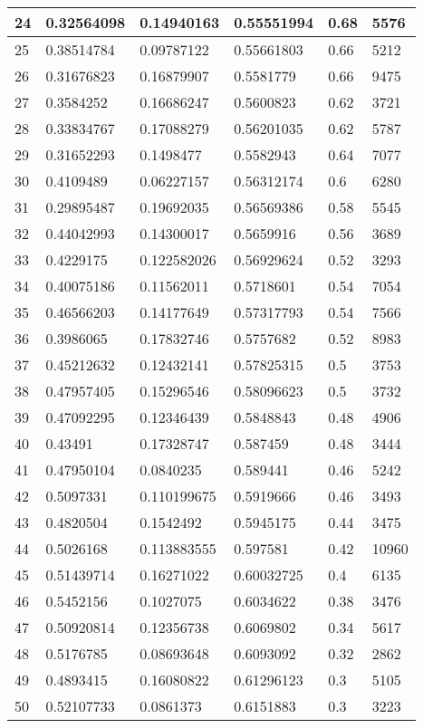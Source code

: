 \begin{longtable}{|l|l|l|l|l|l|}
24 & 0.32564098 & 0.14940163 & 0.55551994 & 0.68 & 5576 \\ \hline 
25 & 0.38514784 & 0.09787122 & 0.55661803 & 0.66 & 5212 \\ \hline 
26 & 0.31676823 & 0.16879907 & 0.5581779 & 0.66 & 9475 \\ \hline 
27 & 0.3584252 & 0.16686247 & 0.5600823 & 0.62 & 3721 \\ \hline 
28 & 0.33834767 & 0.17088279 & 0.56201035 & 0.62 & 5787 \\ \hline 
29 & 0.31652293 & 0.1498477 & 0.5582943 & 0.64 & 7077 \\ \hline 
30 & 0.4109489 & 0.06227157 & 0.56312174 & 0.6 & 6280 \\ \hline 
31 & 0.29895487 & 0.19692035 & 0.56569386 & 0.58 & 5545 \\ \hline 
32 & 0.44042993 & 0.14300017 & 0.5659916 & 0.56 & 3689 \\ \hline 
33 & 0.4229175 & 0.122582026 & 0.56929624 & 0.52 & 3293 \\ \hline 
34 & 0.40075186 & 0.11562011 & 0.5718601 & 0.54 & 7054 \\ \hline 
35 & 0.46566203 & 0.14177649 & 0.57317793 & 0.54 & 7566 \\ \hline 
36 & 0.3986065 & 0.17832746 & 0.5757682 & 0.52 & 8983 \\ \hline 
37 & 0.45212632 & 0.12432141 & 0.57825315 & 0.5 & 3753 \\ \hline 
38 & 0.47957405 & 0.15296546 & 0.58096623 & 0.5 & 3732 \\ \hline 
39 & 0.47092295 & 0.12346439 & 0.5848843 & 0.48 & 4906 \\ \hline 
40 & 0.43491 & 0.17328747 & 0.587459 & 0.48 & 3444 \\ \hline 
41 & 0.47950104 & 0.0840235 & 0.589441 & 0.46 & 5242 \\ \hline 
42 & 0.5097331 & 0.110199675 & 0.5919666 & 0.46 & 3493 \\ \hline 
43 & 0.4820504 & 0.1542492 & 0.5945175 & 0.44 & 3475 \\ \hline 
44 & 0.5026168 & 0.113883555 & 0.597581 & 0.42 & 10960 \\ \hline 
45 & 0.51439714 & 0.16271022 & 0.60032725 & 0.4 & 6135 \\ \hline 
46 & 0.5452156 & 0.1027075 & 0.6034622 & 0.38 & 3476 \\ \hline 
47 & 0.50920814 & 0.12356738 & 0.6069802 & 0.34 & 5617 \\ \hline 
48 & 0.5176785 & 0.08693648 & 0.6093092 & 0.32 & 2862 \\ \hline 
49 & 0.4893415 & 0.16080822 & 0.61296123 & 0.3 & 5105 \\ \hline 
50 & 0.52107733 & 0.0861373 & 0.6151883 & 0.3 & 3223 \\ \hline 
\end{longtable}